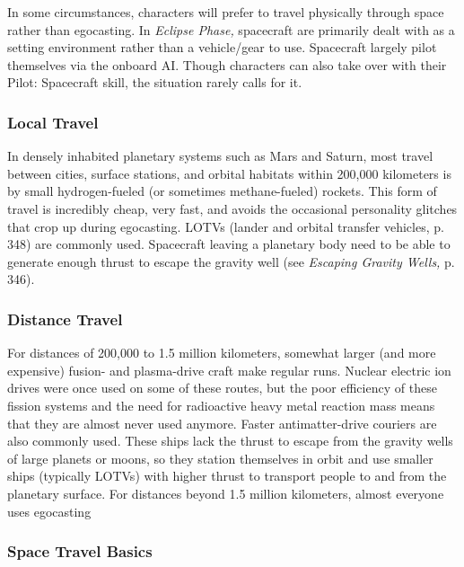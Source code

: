 In some circumstances, characters will prefer to travel 
physically through space rather than egocasting. In 
\textit{Eclipse Phase,} spacecraft are primarily dealt with as a 
setting environment rather than a vehicle/gear to use. 
Spacecraft largely pilot themselves via the onboard AI. 
Though characters can also take over with their Pilot: 
Spacecraft skill, the situation rarely calls for it.

\subsubsection{Local Travel}

In densely inhabited planetary systems such as Mars 
and Saturn, most travel between cities, surface stations, 
and orbital habitats within 200,000 kilometers is by 
small hydrogen-fueled (or sometimes methane-fueled) 
rockets. This form of travel is incredibly cheap, very 
fast, and avoids the occasional personality glitches 
that crop up during egocasting. LOTVs (lander and 
orbital transfer vehicles, p. 348) are commonly used. 
Spacecraft leaving a planetary body need to be able to 
generate enough thrust to escape the gravity well (see 
\textit{Escaping Gravity Wells,} p. 346).

\subsubsection{Distance Travel}

For distances of 200,000 to 1.5 million kilometers, 
somewhat larger (and more expensive) fusion- and 
plasma-drive craft make regular runs. Nuclear electric 
ion drives were once used on some of these routes, 
but the poor efficiency of these fission systems and the 
need for radioactive heavy metal reaction mass means 
that they are almost never used anymore. Faster antimatter-drive
couriers are also commonly used. These
ships lack the thrust to escape from the gravity wells 
of large planets or moons, so they station themselves 
in orbit and use smaller ships (typically LOTVs) with 
higher thrust to transport people to and from the 
planetary surface.
For distances beyond 1.5 million kilometers, almost 
everyone uses egocasting

\subsubsection{Space Travel Basics}

